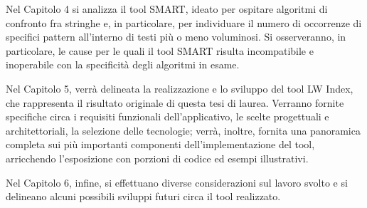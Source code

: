 Nel Capitolo 4 si analizza il tool SMART, ideato per ospitare algoritmi di confronto fra stringhe e, in particolare, per individuare il numero di occorrenze di specifici pattern all'interno di testi più o meno voluminosi. Si osserveranno, in particolare, le cause per le quali il tool SMART risulta incompatibile e inoperabile con la specificità degli algoritmi in esame.

Nel Capitolo 5, verrà delineata la realizzazione e lo sviluppo del tool LW Index, che rappresenta il risultato originale di questa tesi di laurea. Verranno fornite specifiche circa i requisiti funzionali dell'applicativo, le scelte progettuali e architettoriali, la selezione delle tecnologie; verrà, inoltre, fornita una panoramica completa sui più importanti componenti dell'implementazione del tool, arricchendo l'esposizione con porzioni di codice ed esempi illustrativi.

Nel Capitolo 6, infine, si effettuano diverse considerazioni sul lavoro svolto e si delineano alcuni possibili sviluppi futuri circa il tool realizzato.